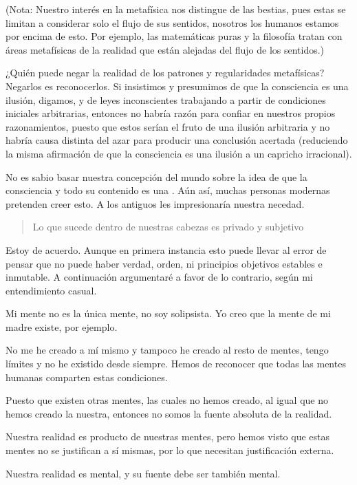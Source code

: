 \documentclass[12pt]{article}
\begin{document}
	(Nota: Nuestro interés en la metafísica nos distingue de las bestias,
	pues estas se limitan a considerar solo el flujo de sus sentidos,
	nosotros los humanos estamos por encima de esto. Por ejemplo, las
	matemáticas puras y la filosofía tratan con áreas metafísicas de la
	realidad que están alejadas del flujo de los sentidos.)
	
	¿Quién puede negar la realidad de los patrones y regularidades
	metafísicas? Negarlos es reconocerlos. Si insistimos y presumimos de que
	la consciencia es una ilusión, digamos,
	 y de leyes inconscientes trabajando a
	partir de condiciones iniciales arbitrarias, entonces no habría razón
	para confiar en nuestros propios razonamientos, puesto que estos serían
	el fruto de una ilusión arbitraria y no habría causa distinta del azar
	para producir una conclusión acertada (reduciendo la misma afirmación de
	que la consciencia es una ilusión a un capricho irracional).
	
	No es sabio basar nuestra concepción del mundo sobre la idea de que la
	consciencia y todo su contenido es una . Aún así,
	muchas personas modernas pretenden creer esto. A los antiguos les
	impresionaría nuestra necedad.
	
	\blockquote[]{Lo que sucede dentro de nuestras cabezas es privado y
	subjetivo}
	
	Estoy de acuerdo. Aunque en primera instancia esto puede llevar al error
	de pensar que no puede haber verdad, orden, ni principios objetivos
	estables e inmutable. A continuación argumentaré a favor de lo
	contrario, según mi entendimiento casual.
	
	Mi mente no es la única mente, no soy solipsista. Yo creo que la mente
	de mi madre existe, por ejemplo.
	
	No me he creado a mí mismo y tampoco he creado al resto de mentes, tengo
	límites y no he existido desde siempre. Hemos de reconocer que todas las
	mentes humanas comparten estas condiciones.
	
	Puesto que existen otras mentes, las cuales no hemos creado, al igual
	que no hemos creado la nuestra, entonces no somos la fuente absoluta de
	la realidad.
	
	Nuestra realidad es producto de nuestras mentes, pero hemos visto que
	estas mentes no se justifican a sí mismas, por lo que necesitan
	justificación externa.
	
	Nuestra realidad es mental, y su fuente debe ser también mental.
	
\end{document}
